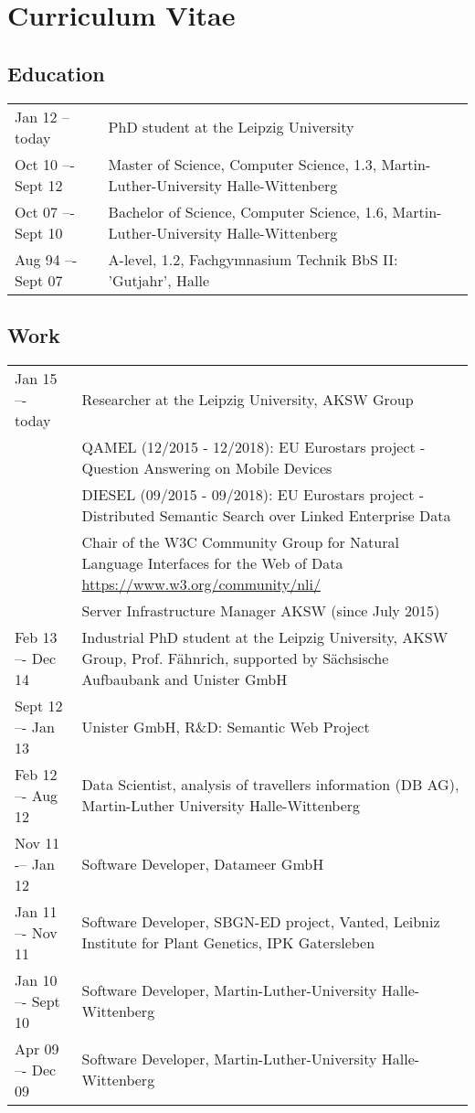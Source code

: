 \chapter{Curriculum Vitae}

\section*{Education}
\begin{tabular}{p{3cm}p{10cm}}	
Jan 12 -- today		&  	PhD student at the Leipzig University\\
Oct 10 –- Sept 12		&  	Master of Science, Computer Science, 1.3, Martin-Luther-University Halle-Wittenberg\\
Oct 07 –- Sept 10		&  	Bachelor of Science, Computer Science, 1.6, Martin-Luther-University Halle-Wittenberg\\
Aug 94 –- Sept 07		&  	A-level, 1.2, Fachgymnasium Technik BbS II: 'Gutjahr', Halle\\
\end{tabular}

\section*{Work}
\begin{tabular}{p{3cm}p{10cm}}	
Jan 15 –- today      & Researcher at the Leipzig University, AKSW Group \\
& {QAMEL} (12/2015 - 12/2018): EU Eurostars project - Question Answering on Mobile Devices\\
& {DIESEL} (09/2015 - 09/2018): EU Eurostars project - Distributed Semantic Search over Linked Enterprise Data\\
& {Chair} of the W3C Community Group for Natural Language Interfaces for the Web of Data \url{https://www.w3.org/community/nli/}\\
& {Server Infrastructure Manager AKSW} (since July 2015)\\
Feb 13 –- Dec 14     & Industrial PhD student at the Leipzig University, AKSW Group, Prof. Fähnrich, supported by Sächsische Aufbaubank and Unister GmbH\\
Sept 12 –- Jan 13    & Unister GmbH, R\&D: Semantic Web Project\\
Feb 12 –- Aug 12	    & Data Scientist, analysis of travellers information (DB AG), Martin-Luther University Halle-Wittenberg\\
Nov 11 -– Jan 12	    & Software Developer, Datameer GmbH\\
Jan 11 –- Nov 11	    & Software Developer, SBGN-ED project, Vanted, Leibniz Institute for Plant Genetics, IPK Gatersleben\\
Jan 10 –- Sept 10	& Software Developer, Martin-Luther-University Halle-Wittenberg\\
Apr 09 –- Dec 09	& Software Developer, Martin-Luther-University Halle-Wittenberg\\
\end{tabular}

